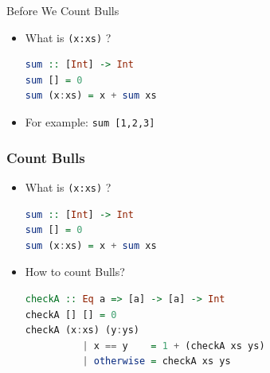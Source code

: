 \documentclass[10pt]{beamer}
\begin{document}
\begin{frame}[fragile]
{Before We Count Bulls}
    \begin{itemize}[<+->]
    \item What is \texttt{(x:xs)} ?\\ \begin{lstlisting}[language=Haskell,numbers=none]
sum :: [Int] -> Int 
sum [] = 0 
sum (x:xs) = x + sum xs 
    \end{lstlisting}
    
    \item For example: \texttt{sum [1,2,3]}\\
    \end{itemize}
\end{frame}


\begin{frame}[fragile]
\frametitle{Count Bulls}
\begin{itemize}%
    \item What is \texttt{(x:xs)} ?\\ \begin{lstlisting}[language=Haskell,numbers=none]
sum :: [Int] -> Int 
sum [] = 0 
sum (x:xs) = x + sum xs 
    \end{lstlisting}
    
    \item How to count Bulls?\\
     \begin{lstlisting}[language=Haskell]
checkA :: Eq a => [a] -> [a] -> Int
checkA [] [] = 0
checkA (x:xs) (y:ys)
          | x == y    = 1 + (checkA xs ys)
          | otherwise = checkA xs ys
    \end{lstlisting}
\end{itemize}
    
\end{frame}
\end{document}
